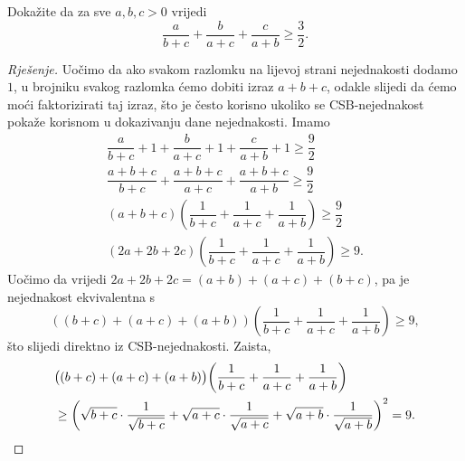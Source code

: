 \begin{exercise}
Dokažite da za sve $a, b, c>0$ vrijedi
$$\dfrac{a}{b+c}+\dfrac{b}{a+c}+\dfrac{c}{a+b}\geq \dfrac{3}{2}.$$
\end{exercise}
\begin{proof}[Rješenje]
Uočimo da ako svakom razlomku na lijevoj strani nejednakosti dodamo $1$, u brojniku svakog razlomka ćemo dobiti izraz $a+b+c$, odakle slijedi da ćemo moći faktorizirati taj izraz, što je često korisno ukoliko se CSB-nejednakost pokaže korisnom u dokazivanju dane nejednakosti. Imamo
\begin{gather*}
\dfrac{a}{b+c}+1+\dfrac{b}{a+c}+1+\dfrac{c}{a+b}+1\geq \dfrac{9}{2}\\
\dfrac{a+b+c}{b+c}+\dfrac{a+b+c}{a+c}+\dfrac{a+b+c}{a+b}\geq \dfrac{9}{2}\\
(a+b+c)\left(\dfrac{1}{b+c}+\dfrac{1}{a+c}+\dfrac{1}{a+b}\right)\geq \dfrac{9}{2}\\
(2a+2b+2c)\left(\dfrac{1}{b+c}+\dfrac{1}{a+c}+\dfrac{1}{a+b}\right)\geq 9.
\end{gather*}
Uočimo da vrijedi $2a+2b+2c=(a+b)+(a+c)+(b+c)$, pa je nejednakost ekvivalentna s
$$\left((b+c)+(a+c)+(a+b)\right)\left(\dfrac{1}{b+c}+\dfrac{1}{a+c}+\dfrac{1}{a+b}\right)\geq 9,$$
što slijedi direktno iz CSB-nejednakosti. Zaista,
\begin{align*}
&\left((b+c)+(a+c)+(a+b)\right)\left(\dfrac{1}{b+c}+\dfrac{1}{a+c}+\dfrac{1}{a+b}\right)\\ &\geq\left(\sqrt{b+c}\cdot \dfrac{1}{\sqrt{b+c}}+\sqrt{a+c}\cdot \dfrac{1}{\sqrt{a+c}}+\sqrt{a+b}\cdot \dfrac{1}{\sqrt{a+b}}\right)^2=9. \qedhere
\end{align*}
\end{proof}
